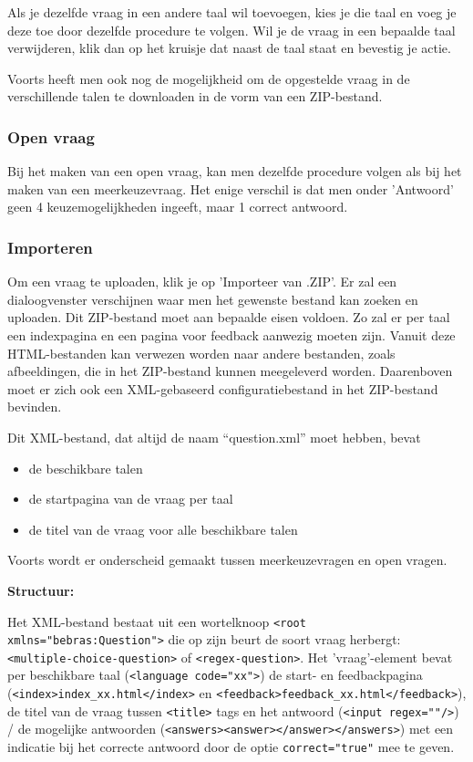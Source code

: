 \documentclass[]{article}
\begin{document}
Als je dezelfde vraag in een andere taal wil toevoegen, kies je die taal en voeg je deze toe door dezelfde procedure te volgen. Wil je de vraag in een bepaalde taal verwijderen, klik dan op het kruisje dat naast de taal staat en bevestig je actie. 

Voorts heeft men ook nog de mogelijkheid om de opgestelde vraag in de verschillende talen te downloaden in de vorm van een ZIP-bestand. 

\subsubsection{Open vraag}

Bij het maken van een open vraag, kan men dezelfde procedure volgen als bij het maken van een meerkeuzevraag. Het enige verschil is dat men onder 'Antwoord' geen 4 keuzemogelijkheden ingeeft, maar 1 correct antwoord.

\subsubsection{Importeren}
Om een vraag te uploaden, klik je op 'Importeer van .ZIP'. Er zal een dialoogvenster verschijnen waar men het gewenste bestand kan zoeken en uploaden. Dit ZIP-bestand moet aan bepaalde eisen voldoen. Zo zal er per taal een indexpagina en een pagina voor feedback aanwezig moeten zijn. Vanuit deze HTML-bestanden kan verwezen worden naar andere bestanden, zoals afbeeldingen, die in het ZIP-bestand kunnen meegeleverd worden. Daarenboven moet er zich ook een XML-gebaseerd configuratiebestand in het ZIP-bestand bevinden. 

Dit XML-bestand, dat altijd de naam "`question.xml"' moet hebben, bevat
\begin{itemize}
\item de beschikbare talen
\item de startpagina van de vraag per taal
\item de titel van de vraag voor alle beschikbare talen
\end{itemize}

Voorts wordt er onderscheid gemaakt tussen meerkeuzevragen en open vragen.

\textbf{Structuur:}

Het XML-bestand bestaat uit een wortelknoop \verb+<root xmlns="bebras:Question">+ 
die op zijn beurt de soort vraag herbergt: \verb+<multiple-choice-question>+ of \verb+<regex-question>+.
Het 'vraag'-element bevat per beschikbare taal (\verb+<language code="xx">+) 
de start- en feedbackpagina (\verb+<index>index_xx.html</index>+ en \verb+<feedback>feedback_xx.html</feedback>+), 
de titel van de vraag tussen \verb+<title>+ tags 
en het antwoord (\verb+<input regex=""/>+) / de mogelijke antwoorden (\verb+<answers><answer></answer></answers>+)
met een indicatie bij het correcte antwoord door de optie \verb+correct="true"+ mee te geven.
\end{document}

